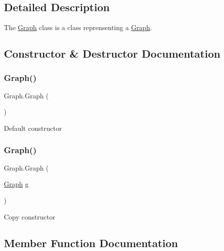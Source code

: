 \subsection{Detailed Description}
The \hyperlink{classGraph}{Graph} class is a class reprensenting a \hyperlink{classGraph}{Graph}. 



\subsection{Constructor \& Destructor Documentation}
\mbox{\label{classGraph_ab8ccb82fd216cc5a36c3887c6820428f}} 
\subsubsection{\texorpdfstring{Graph()}{Graph()}\hspace{0.1cm}{\footnotesize\ttfamily [1/2]}}
{\footnotesize\ttfamily Graph.\+Graph (\begin{DoxyParamCaption}{ }\end{DoxyParamCaption})\hspace{0.3cm}{\ttfamily [inline]}}



Default constructor 

\mbox{\label{classGraph_a7dfaf3d08909226f2ccd75e4addc3edb}} 
\subsubsection{\texorpdfstring{Graph()}{Graph()}\hspace{0.1cm}{\footnotesize\ttfamily [2/2]}}
{\footnotesize\ttfamily Graph.\+Graph (\begin{DoxyParamCaption}\item[{\hyperlink{classGraph}{Graph}}]{g }\end{DoxyParamCaption})\hspace{0.3cm}{\ttfamily [inline]}}



Copy constructor 



\subsection{Member Function Documentation}
\mbox{\label{classGraph_ab127ce44aba9820eae1ea8a2bc379b1c}} 
